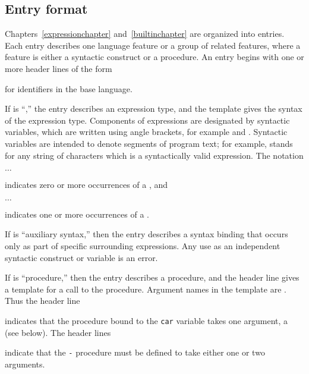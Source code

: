 \subsection{Entry format}

Chapters~\ref{expressionchapter} and~\ref{builtinchapter} are organized
into entries.  Each entry describes one language feature or a group of
related features, where a feature is either a syntactic construct or a
procedure.  An entry begins with one or more header lines of the form

\noindent{}\unpenalty

for identifiers in the base language.

If  is ``\exprtype,'' the entry describes an expression
type, and the template gives the syntax of the expression type.
Components of expressions are designated by syntactic variables, which
are written using angle brackets, for example  and
.  Syntactic variables are intended to denote segments of
program text; for example,  stands for any string of
characters which is a syntactically valid expression.  The notation
\begin{tabbing}
\qquad {} $\ldots$
\end{tabbing}
indicates zero or more occurrences of a , and
\begin{tabbing}
\qquad {}  $\ldots$
\end{tabbing}
indicates one or more occurrences of a .

If  is ``auxiliary syntax,'' then the entry describes a
syntax binding that occurs only as part of specific surrounding
expressions. Any use as an independent syntactic construct or
variable is an error.

If  is ``procedure,'' then the entry describes a procedure, and
the header line gives a template for a call to the procedure.  Argument
names in the template are .  Thus the header line

\noindent{}\unpenalty

indicates that the procedure bound to the {\tt car} variable takes
one argument, a  (see below).  The header lines

\noindent%
\unpenalty

indicate that the {\tt -} procedure must be defined to take
either one or two arguments.

